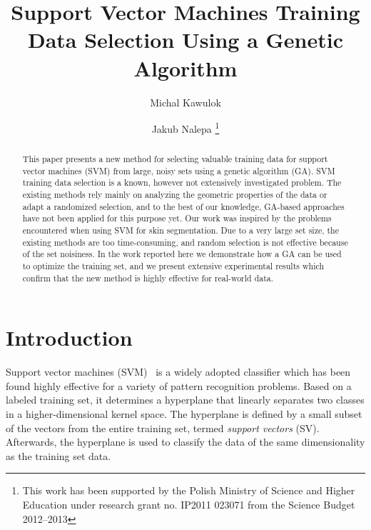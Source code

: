\documentclass{llncs}
\begin{document}
\title{Support Vector Machines Training Data Selection Using a Genetic Algorithm }

\author{Michal Kawulok  \and Jakub Nalepa \thanks{This work has been supported by the Polish Ministry of Science
and Higher Education under research grant no. IP2011 023071 from the
Science Budget 2012--2013}}



\maketitle

\begin{abstract}
This paper presents a new method for selecting valuable training
data for support vector machines (SVM) from large, noisy sets using
a genetic algorithm (GA). SVM training data selection is a known,
however not extensively investigated problem. The existing methods
rely mainly on analyzing the geometric properties of the data or
adapt a randomized selection, and to the best of our knowledge,
GA-based approaches have not been applied for this purpose yet. Our
work was inspired by the problems encountered when using SVM for
skin segmentation. Due to a very large set size, the existing
methods are too time-consuming, and random selection is not
effective because of the set noisiness. In the work reported here we
demonstrate how a GA can be used to optimize the training set, and we
present extensive experimental results which confirm that the new
method is highly effective for real-world data.
\end{abstract}

\section{Introduction}
Support vector machines (SVM)~\cite{Cortes1995} is a widely adopted
classifier which has been found highly effective for a variety of
pattern recognition problems. Based on a labeled training set, it
determines a hyperplane that linearly separates two classes in a
higher-dimensional kernel space. The hyperplane is defined by a
small subset of the vectors from the entire training set, termed
\emph{support vectors} (SV). Afterwards, the hyperplane is used to
classify the data of the same dimensionality as the training set
data.
\end{document}
